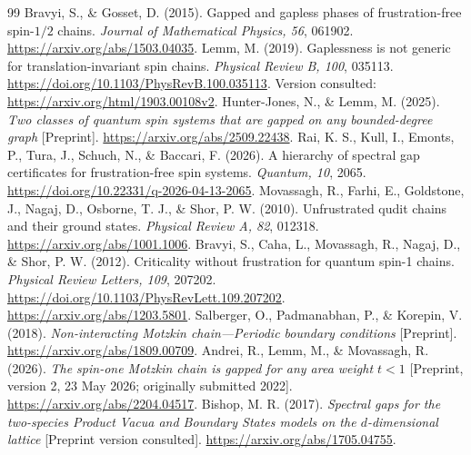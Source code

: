 \documentclass[11pt,a4paper]{article}
\theoremstyle{remark}\newtheorem{remark}[theorem]{Remark}
\begin{document}
\begin{thebibliography}{99}
 Bravyi, S., \& Gosset, D. (2015). Gapped and gapless phases of frustration-free spin-$1/2$ chains. \emph{Journal of Mathematical Physics, 56}, 061902. \url{https://arxiv.org/abs/1503.04035}.
 Lemm, M. (2019). Gaplessness is not generic for translation-invariant spin chains. \emph{Physical Review B, 100}, 035113. \url{https://doi.org/10.1103/PhysRevB.100.035113}. Version consulted: \url{https://arxiv.org/html/1903.00108v2}.
 Hunter-Jones, N., \& Lemm, M. (2025). \emph{Two classes of quantum spin systems that are gapped on any bounded-degree graph} [Preprint]. \url{https://arxiv.org/abs/2509.22438}.
 Rai, K. S., Kull, I., Emonts, P., Tura, J., Schuch, N., \& Baccari, F. (2026). A hierarchy of spectral gap certificates for frustration-free spin systems. \emph{Quantum, 10}, 2065. \url{https://doi.org/10.22331/q-2026-04-13-2065}.
 Movassagh, R., Farhi, E., Goldstone, J., Nagaj, D., Osborne, T. J., \& Shor, P. W. (2010). Unfrustrated qudit chains and their ground states. \emph{Physical Review A, 82}, 012318. \url{https://arxiv.org/abs/1001.1006}.
 Bravyi, S., Caha, L., Movassagh, R., Nagaj, D., \& Shor, P. W. (2012). Criticality without frustration for quantum spin-1 chains. \emph{Physical Review Letters, 109}, 207202. \url{https://doi.org/10.1103/PhysRevLett.109.207202}. \url{https://arxiv.org/abs/1203.5801}.
 Salberger, O., Padmanabhan, P., \& Korepin, V. (2018). \emph{Non-interacting Motzkin chain---Periodic boundary conditions} [Preprint]. \url{https://arxiv.org/abs/1809.00709}.
 Andrei, R., Lemm, M., \& Movassagh, R. (2026). \emph{The spin-one Motzkin chain is gapped for any area weight $t<1$} [Preprint, version 2, 23 May 2026; originally submitted 2022]. \url{https://arxiv.org/abs/2204.04517}.
 Bishop, M. R. (2017). \emph{Spectral gaps for the two-species Product Vacua and Boundary States models on the $d$-dimensional lattice} [Preprint version consulted]. \url{https://arxiv.org/abs/1705.04755}.
\end{thebibliography}
\end{document}
